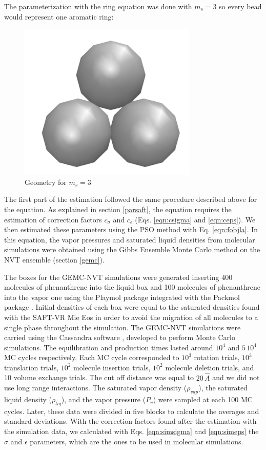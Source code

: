 The parameterization with the  ring equation was done with $m_{s}=3$ so every bead would represent one aromatic ring:

\begin{figure}[th]
	\centering
	\includegraphics[width=0.15\linewidth]{Figures/fe3}
	\caption{Geometry for $m_{s}=3$}
	\label{fig:fen3}
\end{figure}

The first part of the estimation followed the same procedure described above for the  equation. As explained in section \ref{parsaft}, the  equation requires the estimation of correction factors $c_{\sigma}$ and $c_{\epsilon}$ (Eqs. \eqref{eqn:csigma} and \eqref{eqn:ceps}). We then estimated these parameters using the PSO method with Eq. \eqref{eqn:fobjla}. In this equation, the vapor pressures and saturated liquid densities from molecular simulations were obtained using the Gibbs Ensemble Monte Carlo method on the NVT ensemble  (section \ref{gemc}).

The boxes for the GEMC-NVT simulations were generated inserting 400 molecules of phenanthrene into the liquid box and 100 molecules of phenanthrene into the vapor one using the Playmol package \cite{playmol} integrated with the Packmol package \cite{packmol}. Initial densities of each box were equal to the saturated densities found with the SAFT-VR Mie Eos in order to avoid the migration of all molecules to a single phase throughout the simulation. The GEMC-NVT simulations were carried using the Cassandra software \cite{doi:10.1063/1.3644939}, developed to perform Monte Carlo simulations. The equilibration and production times lasted around  $10^{4}$ and $5 \, 10^{4}$ MC cycles respectively. Each MC cycle corresponded to $10^3$ rotation trials, $10^3$ translation trials, $10^2$ molecule insertion trials, $10^2$ molecule deletion trials, and 10 volume exchange trials. The cut off distance was equal to $20 \, \hat{A}$ and we did not use long range interactions. The saturated vapor density ($\rho_{vap}$), the saturated liquid density ($\rho_{liq}$), and the vapor pressure ($P_{v}$) were sampled at each 100 MC cycles. Later, these data were divided in five blocks to calculate the averages and standard deviations. With the correction factors found after the estimation with the simulation data, we calculated with Eqs. \eqref{eqn:simsigma} and \eqref{eqn:simeps} the $\sigma$ and $\epsilon$ parameters, which are the ones to be used in molecular simulations.


